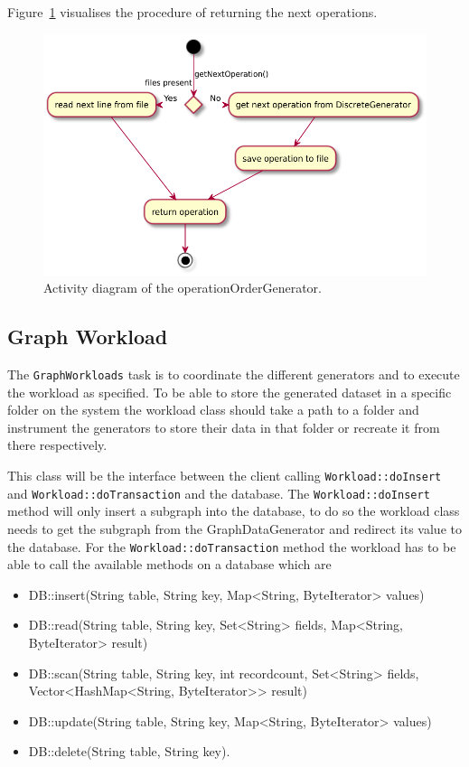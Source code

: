 Figure~\ref{fig:operationOrderGenerator} visualises the procedure of returning the next operations.

\begin{figure}
  \includegraphics[width=\textwidth]{images/extensions/OperationOrderGenerator}
  \caption{Activity diagram of the operationOrderGenerator.\todo{}}
  \label{fig:operationOrderGenerator}
\end{figure}

\subsection{Graph Workload}
The \texttt{GraphWorkloads} task is to coordinate the different generators and to execute the workload as specified.
To be able to store the generated dataset in a specific folder on the system the workload class should take a path to a folder and instrument the generators to store their data in that folder or recreate it from there respectively.

This class will be the interface between the client calling \texttt{Workload::doInsert} and \texttt{Workload::doTransaction} and the database.
The \texttt{Workload::doInsert} method will only insert a subgraph into the database,
to do so the workload class needs to get the subgraph from the GraphDataGenerator and redirect its value to the database.
For the \texttt{Workload::doTransaction} method the workload has to be able to call the available methods on a database which are

\pagebreak

\begin{itemize}
  \item DB::insert(String table, String key, Map<String, ByteIterator> values)
  \item DB::read(String table, String key, Set<String> fields, Map<String, ByteIterator> result)
  \item DB::scan(String table, String key, int recordcount, Set<String> fields, Vector<HashMap<String, ByteIterator>{}> result)
  \item DB::update(String table, String key, Map<String, ByteIterator> values)
  \item DB::delete(String table, String key).
\end{itemize}

